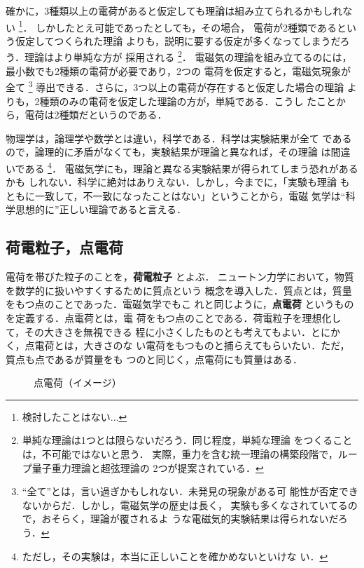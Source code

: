     確かに，3種類以上の電荷があると仮定しても理論は組み立てられるかもしれない
        \footnote{
            検討したことはない...
        }．
    しかしたとえ可能であったとしても，その場合，
    電荷が2種類であるという仮定してつくられた理論
    よりも，説明に要する仮定が多くなってしまうだろう．理論はより単純な方が
    採用される
        \footnote{
            単純な理論は1つとは限らないだろう．同じ程度，単純な理論
            をつくることは，不可能ではないと思う．
            実際，重力を含む統一理論の構築段階で，ループ量子重力理論と超弦理論の
            2つが提案されている．

        }．
    電磁気の理論を組み立てるのには，最小数でも2種類の電荷が必要であり，2つの
    電荷を仮定すると，電磁気現象が全て
        \footnote{
            “全て”とは，言い過ぎかもしれない．未発見の現象がある可
            能性が否定できないからだ．しかし，電磁気学の歴史は長く，
            実験も多くなされていてるので，おそらく，理論が覆されるよ
            うな電磁気的実験結果は得られないだろう．
        }
    導出できる．さらに，3つ以上の電荷が存在すると仮定した場合の理論
    よりも，2種類のみの電荷を仮定した理論の方が，単純である．こうし
    たことから，電荷は2種類だというのである．

    物理学は，論理学や数学とは違い，科学である．科学は実験結果が全て
    であるので，論理的に矛盾がなくても，実験結果が理論と異なれば，その理論
    は間違いである
        \footnote{
            ただし，その実験は，本当に正しいことを確かめないといけな
            い．
        }．
    電磁気学にも，理論と異なる実験結果が得られてしまう恐れがあるかも
    しれない．科学に絶対はありえない．しかし，今までに，「実験も理論
    もともに一致して，不一致になったことはない」ということから，電磁
    気学は“科学思想的に”正しい理論であると言える．

    \subsection{荷電粒子，点電荷}
    電荷を帯びた粒子のことを，\textbf{荷電粒子} とよぶ．
    ニュートン力学において，物質を数学的に扱いやすくするために質点という
    概念を導入した．質点とは，質量をもつ点のことであった．電磁気学でもこ
    れと同じように，\textbf{点電荷} というものを定義する．点電荷とは，電
    荷をもつ点のことである．荷電粒子を理想化して，その大きさを無視できる
    程に小さくしたものとも考えてもよい．とにかく，点電荷とは，大きさのな
    い電荷をもつものと捕らえてもらいたい．ただ，質点も点であるが質量をも
    つのと同じく，点電荷にも質量はある．
        \begin{figure}[hbt]
            \begin{center}
                \caption{点電荷（イメージ）}
                \label{fig:EM_Denka_Tendenka}
            \end{center}
        \end{figure}

